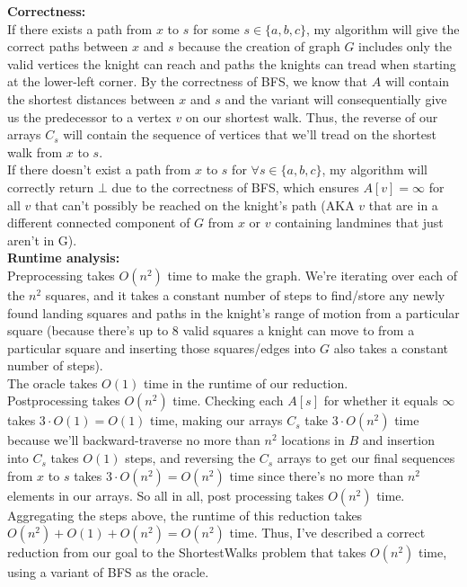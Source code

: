 \documentclass[11pt]{article}
\begin{document}
\begin{enumerate}
\begin{enumerate}
\textbf{Correctness: } \\
If there exists a path from $x$ to $s$ for some $s \in \{a, b, c\}$, my algorithm will give the correct paths between $x$ and $s$ because the creation of graph $G$ includes only the valid vertices the knight can reach and paths the knights can tread when starting at the lower-left corner. By the correctness of BFS, we know that $A$ will contain the shortest distances between $x$ and $s$ and the variant will consequentially give us the predecessor to a vertex $v$ on our shortest walk. Thus, the reverse of our arrays $C_s$ will contain the sequence of vertices that we'll tread on the shortest walk from $x$ to $s$. \\
If there doesn't exist a path from $x$ to $s$ for $\forall s \in \{a, b, c\}$, my algorithm will correctly return $\bot$ due to the correctness of BFS, which ensures $A[v] = \infty$ for all $v$ that can't possibly be reached on the knight's path (AKA $v$ that are in a different connected component of $G$ from $x$ or $v$ containing landmines that just aren't in G). \\

\textbf{Runtime analysis:} \\
Preprocessing takes $O(n^2)$ time to make the graph. We're iterating over each of the $n^2$ squares, and it takes a constant number of steps to find/store any newly found landing squares and paths in the knight's range of motion from a particular square (because there's up to 8 valid squares a knight can move to from a particular square and inserting those squares/edges into $G$ also takes a constant number of steps). \\
The oracle takes $O(1)$ time in the runtime of our reduction. \\
Postprocessing takes $O(n^2)$ time. Checking each $A[s]$ for whether it equals $\infty$ takes $3 \cdot O(1) = O(1)$ time, making our arrays $C_s$ take $3 \cdot O(n^2)$ time because we'll backward-traverse no more than $n^2$ locations in $B$ and insertion into $C_s$ takes $O(1)$ steps, and reversing the $C_s$ arrays to get our final sequences from $x$ to $s$ takes $3 \cdot O(n^2) = O(n^2)$ time since there's no more than $n^2$ elements in our arrays. So all in all, post processing takes $O(n^2)$ time. \\
Aggregating the steps above, the runtime of this reduction takes $O(n^2) + O(1) + O(n^2) = O(n^2)$ time. Thus, I've described a correct reduction from our goal to the ShortestWalks problem that takes $O(n^2)$ time, using a variant of BFS as the oracle. \\


\end{enumerate}
\end{enumerate}
\end{document}

